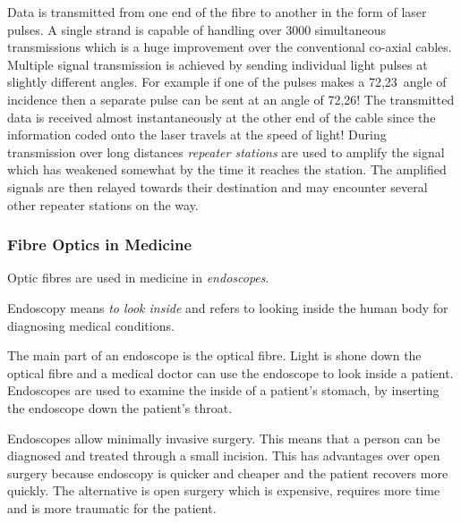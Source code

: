 Data is transmitted from one end of the fibre to another in the form of laser pulses. A single strand is capable of handling over 3000 simultaneous transmissions which is a huge improvement over the conventional co-axial cables. Multiple signal transmission is achieved by sending individual light pulses at slightly different angles. For example if one of the pulses makes a 72,23\deg\ angle of incidence then a separate pulse can be sent at an angle of 72,26\deg! The transmitted data is received almost instantaneously at the other end of the cable since the information coded onto the laser travels at the speed of light! During transmission over long distances \textit{repeater stations} are used to amplify the signal which has weakened somewhat by the time it reaches the station. The amplified signals are then relayed towards their destination and may encounter several other repeater stations on the way.

\subsubsection{Fibre Optics in Medicine}
Optic fibres are used in medicine in \textit{endoscopes}.

\begin{IFact}
{Endoscopy means \textit{to look inside} and refers to looking inside the human body for diagnosing medical conditions.}
\end{IFact}

The main part of an endoscope is the optical fibre. Light is shone down the optical fibre and a medical doctor can use the endoscope to look inside a patient. Endoscopes are used to examine the inside of a patient's stomach, by inserting the endoscope down the patient's throat.

Endoscopes allow minimally invasive surgery. This means that a person can be diagnosed and treated through a small incision. This has advantages over open surgery because endoscopy is quicker and cheaper and the patient recovers more quickly. The alternative is open surgery which is expensive, requires more time and is more traumatic for the patient.

